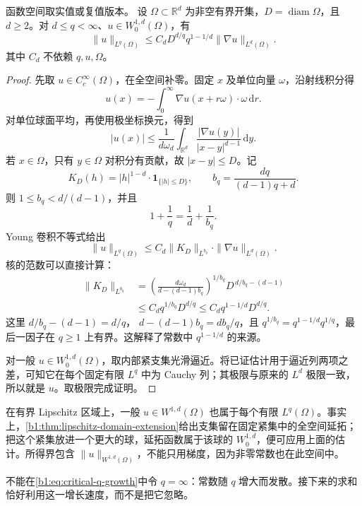 \begin{proposition}\label{b1:prop:critical-finite-q-estimate}
函数空间取实值或复值版本。
设 \(\Omega\subset\mathbb R^d\) 为非空有界开集，\(D=\operatorname{diam}\Omega\)，且 \(d\ge2\)。对 \(d\le q<\infty\)、\(u\in W_0^{1,d}(\Omega)\)，有
\begin{equation}\label{b1:eq:critical-q-growth}
 \|u\|_{L^q(\Omega)}
 \le C_dD^{d/q}q^{1-1/d}\|\nabla u\|_{L^d(\Omega)}.
\end{equation}
其中 \(C_d\) 不依赖 \(q,u,\Omega\)。
\end{proposition}
\begin{proof}
先取 \(u\in C_c^\infty(\Omega)\)，在全空间补零。固定 \(x\) 及单位向量 \(\omega\)，沿射线积分得
\[
 u(x)=-\int_0^\infty\nabla u(x+r\omega)\cdot\omega\,\mathrm dr.
\]
对单位球面平均，再使用极坐标换元，得到
\[
 |u(x)|\le\frac1{d\omega_d}
        \int_{\mathbb R^d}\frac{|\nabla u(y)|}{|x-y|^{d-1}}\,\mathrm dy.
\]
若 \(x\in\Omega\)，只有 \(y\in\Omega\) 对积分有贡献，故 \(|x-y|\le D\)。记
\[
 K_D(h)=|h|^{1-d}\cdot\mathbf1_{\{|h|\le D\}},\qquad
 b_q=\frac{dq}{(d-1)q+d}.
\]
则 \(1\le b_q<d/(d-1)\)，并且
\[
 1+\frac1q=\frac1d+\frac1{b_q}.
\]
Young 卷积不等式给出
\[
 \|u\|_{L^q(\Omega)}
 \le C_d\|K_D\|_{L^{b_q}}\cdot\|\nabla u\|_{L^d(\Omega)}.
\]
核的范数可以直接计算：
\[
 \begin{aligned}
 \|K_D\|_{L^{b_q}}
 &=\left(\frac{d\omega_d}
                    {d-(d-1)b_q}\right)^{1/b_q}
        D^{\,d/b_q-(d-1)}\\
 &\le C_d q^{1/b_q}D^{d/q}
 \le C_d q^{1-1/d}D^{d/q}.
 \end{aligned}
\]
这里 \(d/b_q-(d-1)=d/q\)，
\(d-(d-1)b_q=db_q/q\)，且
\(q^{1/b_q}=q^{1-1/d}q^{1/q}\)，最后一因子在 \(q\ge1\) 上有界。这解释了常数中 \(q^{1-1/d}\) 的来源。

对一般 \(u\in W_0^{1,d}(\Omega)\)，取内部紧支集光滑逼近。将已证估计用于逼近列两项之差，可知它在每个固定有限 \(L^q\) 中为 Cauchy 列；其极限与原来的 \(L^d\) 极限一致，所以就是 \(u\)。取极限完成证明。
\end{proof}

在有界 Lipschitz 区域上，一般 \(u\in W^{1,d}(\Omega)\) 也属于每个有限 \(L^q(\Omega)\)。事实上，\cref{b1:thm:lipschitz-domain-extension}给出支集留在固定紧集中的全空间延拓；把这个紧集放进一个更大的球，延拓函数属于该球的 \(W_0^{1,d}\)，便可应用上面的估计。所得界包含 \(\|u\|_{W^{1,d}(\Omega)}\)，不能只用梯度，因为非零常数也在此空间中。

\ProseParagraphBreak

不能在\eqref{b1:eq:critical-q-growth}中令 \(q=\infty\)：常数随 \(q\) 增大而发散。接下来的求和恰好利用这一增长速度，而不是把它忽略。


